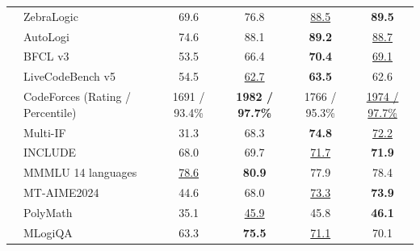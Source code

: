 \begin{table}[tbp]
{\begin{tabular}{@{}clcccc@{}}
& ZebraLogic & 69.6 & 76.8 & \underline{88.5} & \textbf{89.5} \\
& AutoLogi & 74.6 & 88.1 & \textbf{89.2} & \underline{88.7} \\
\midrule
{} & BFCL v3 & 53.5 & 66.4 & \textbf{70.4} & \underline{69.1} \\
& LiveCodeBench v5 & 54.5 & \underline{62.7} & \textbf{63.5} & 62.6 \\
& CodeForces {\tiny{(Rating / Percentile)}} & 1691 / 93.4\% & \textbf{1982 / 97.7\%} & 1766 / 95.3\% & \underline{1974 / 97.7\%} \\
\midrule
{} & Multi-IF & 31.3 & 68.3 & \textbf{74.8} & \underline{72.2} \\
& INCLUDE & 68.0 & 69.7 & \underline{71.7} & \textbf{71.9} \\
& MMMLU {\tiny{14 languages}} & \underline{78.6} & \textbf{80.9} & 77.9 & 78.4 \\
& MT-AIME2024 & 44.6 & 68.0 & \underline{73.3} & \textbf{73.9} \\
& PolyMath & 35.1 & \underline{45.9} & 45.8 & \textbf{46.1} \\
& MLogiQA & 63.3 & \textbf{75.5} & \underline{71.1} & 70.1 \\
\bottomrule
\end{tabular}
}
\vspace{1mm}
\end{table}

